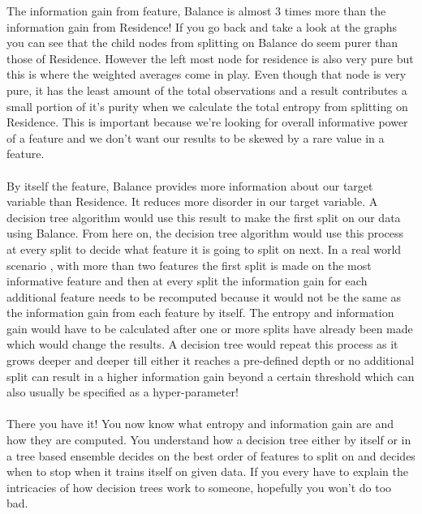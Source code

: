 \documentclass[12pt, A4]{report}
\begin{document}
	The information gain from feature, Balance is almost 3 times more than the information gain from Residence! If you go back and take a look at the graphs you can see that the child nodes from splitting on Balance do seem purer than those of Residence. However the left most node for residence is also very pure but this is where the weighted averages come in play. Even though that node is very pure, it has the least amount of the total observations and a result contributes a small portion of it’s purity when we calculate the total entropy from splitting on Residence. This is important because we’re looking for overall informative power of a feature and we don’t want our results to be skewed by a rare value in a feature.
	\\ \\
	By itself the feature, Balance provides more information about our target variable than Residence. It reduces more disorder in our target variable. A decision tree algorithm would use this result to make the first split on our data using Balance. From here on, the decision tree algorithm would use this process at every split to decide what feature it is going to split on next. In a real world scenario , with more than two features the first split is made on the most informative feature and then at every split the information gain for each additional feature needs to be recomputed because it would not be the same as the information gain from each feature by itself. The entropy and information gain would have to be calculated after one or more splits have already been made which would change the results. A decision tree would repeat this process as it grows deeper and deeper till either it reaches a pre-defined depth or no additional split can result in a higher information gain beyond a certain threshold which can also usually be specified as a hyper-parameter!
\\ \\
	There you have it! You now know what entropy and information gain are and how they are computed. You understand how a decision tree either by itself or in a tree based ensemble decides on the best order of features to split on and decides when to stop when it trains itself on given data. If you every have to explain the intricacies of how decision trees work to someone, hopefully you won’t do too bad.\\
\end{document}

